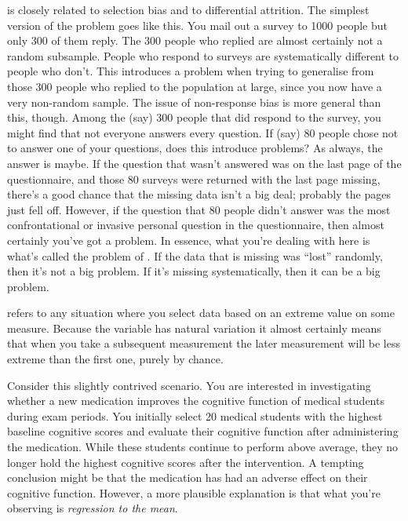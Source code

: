 
 is closely related to selection bias and to differential attrition. The simplest version of the problem goes like this. You mail out a survey to 1000 people but only 300 of them reply. The 300 people who replied are almost certainly not a random subsample. People who respond to surveys are systematically different to people who don't. This introduces a problem when trying to generalise from those 300 people who replied to the population at large, since you now have a very non-random sample. The issue of non-response bias is more general than this, though. Among the (say) 300 people that did respond to the survey, you might find that not everyone answers every question. If (say) 80 people chose not to answer one of your questions, does this introduce problems? As always, the answer is maybe. If the question that wasn't answered was on the last page of the questionnaire, and those 80 surveys were returned with the last page missing, there's a good chance that the missing data isn't a big deal; probably the pages just fell off. However, if the question that 80 people didn't answer was the most confrontational or invasive personal question in the questionnaire, then almost certainly you've got a problem. In essence, what you're dealing with here is what's called the problem of . If the data that is missing was ``lost'' randomly, then it's not a big problem. If it's missing systematically, then it can be a big problem.


 refers to any situation where you select data based on an extreme value on some measure. Because the variable has natural variation it almost certainly means that when you take a subsequent measurement the later measurement will be less extreme than the first one, purely by chance. 

Consider this slightly contrived scenario. You are interested in investigating whether a new medication improves the cognitive function of medical students during exam periods. You initially select 20 medical students with the highest baseline cognitive scores and evaluate their cognitive function after administering the medication. While these students continue to perform above average, they no longer hold the highest cognitive scores after the intervention. A tempting conclusion might be that the medication has had an adverse effect on their cognitive function. However, a more plausible explanation is that what you're observing is \textit{regression to the mean}.

